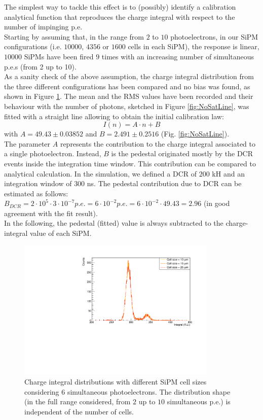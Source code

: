 The simplest way to tackle this effect is to (possibly) identify a calibration analytical function that reproduces the charge integral with respect to the number of impinging p.e.\\
Starting by assuming that, in the range from $2$ to $10$ photoelectrons, in our SiPM configurations (i.e. $10000$, $4356$ or $1600$ cells in each SiPM),
the response is linear, $10000$ SiPMs have been fired $9$ times with an increasing number of simultaneous p.e.s (from 2 up to 10).\\
As a sanity check of the above assumption, the charge integral distribution from the three different configurations has been compared and no bias was found, as shown in Figure \ref{fig:SatCheck}. The mean and the RMS values have been recorded and their behaviour with the number of photons, sketched in Figure \ref{fig:NoSatLine}, was fitted with a straight line allowing to obtain the initial calibration law:
\begin{equation}
	I(n) = A \cdot n + B
\end{equation}
with $A = 49.43 \pm 0.03852$ and $B = 2.491 \pm 0.2516$ (Fig. \ref{fig:NoSatLine}).\\
The parameter $A$ represents the contribution to the charge integral associated to a single photoelectron. Instead, $B$ is the pedestal originated mostly by the DCR events inside the integration time window. This contribution can be compared to analytical calculation.
In the simulation, we defined a DCR of $200$ kH and an integration window of $300$ ns. The pedestal contribution due to DCR can be estimated as follows:\\
$B_{DCR} = 2 \cdot 10^5 \cdot 3 \cdot 10^{-7} p.e. = 6\cdot 10^{-2} p.e. = 6\cdot 10^{-2} \cdot 49.43 = 2.96$ (in good agreement with the fit result).\\
In the following, the pedestal (fitted) value is always subtracted to the charge-integral value of each SiPM.\\

\begin{figure}
	\centering
	\includegraphics[width=0.85\textwidth]{IMG/Cap5/6pe_sat}
	\caption{Charge integral distributions with different SiPM cell sizes considering $6$ simultaneous photoelectrons. The distribution shape (in the full range considered, from $2$ up to $10$ simultaneous p.e.) is independent of the number of cells.
	}
	\label{fig:SatCheck}
\end{figure}

